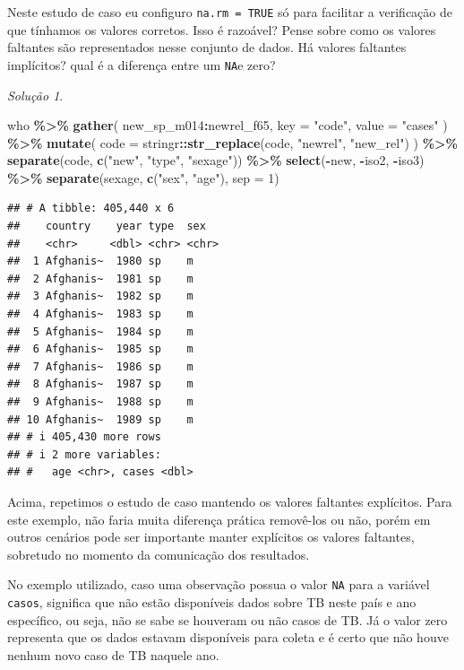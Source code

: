 \documentclass[
]{latex/krantz}
\newenvironment{Shaded}{\begin{snugshade}}{\end{snugshade}}
\newcommand{\AttributeTok}[1]{\textcolor[rgb]{0.13,0.29,0.53}{#1}}
\newcommand{\DecValTok}[1]{\textcolor[rgb]{0.00,0.00,0.81}{#1}}
\newcommand{\FunctionTok}[1]{\textcolor[rgb]{0.13,0.29,0.53}{\textbf{#1}}}
\newcommand{\NormalTok}[1]{#1}
\newcommand{\SpecialCharTok}[1]{\textcolor[rgb]{0.81,0.36,0.00}{\textbf{#1}}}
\newcommand{\StringTok}[1]{\textcolor[rgb]{0.31,0.60,0.02}{#1}}
\theoremstyle{definition}
\theoremstyle{definition}
\theoremstyle{definition}
\theoremstyle{definition}
\theoremstyle{remark}
\newtheorem*{solution}{Solução}
\begin{document}
Neste estudo de caso eu configuro \texttt{na.rm\ =\ TRUE} só para facilitar a verificação de que tínhamos os valores corretos. Isso é razoável? Pense sobre como os valores faltantes são representados nesse conjunto de dados. Há valores faltantes implícitos? qual é a diferença entre um \texttt{NA}e zero?

\begin{solution}
\leavevmode

\begin{Shaded}
\begin{Highlighting}[]
\NormalTok{who }\SpecialCharTok{\%\textgreater{}\%}
  \FunctionTok{gather}\NormalTok{(}
\NormalTok{    new\_sp\_m014}\SpecialCharTok{:}\NormalTok{newrel\_f65, }
    \AttributeTok{key =} \StringTok{"code"}\NormalTok{,}
    \AttributeTok{value =} \StringTok{"cases"}
\NormalTok{  ) }\SpecialCharTok{\%\textgreater{}\%}
  \FunctionTok{mutate}\NormalTok{(}
    \AttributeTok{code =}\NormalTok{ stringr}\SpecialCharTok{::}\FunctionTok{str\_replace}\NormalTok{(code, }\StringTok{"newrel"}\NormalTok{, }\StringTok{"new\_rel"}\NormalTok{)}
\NormalTok{  ) }\SpecialCharTok{\%\textgreater{}\%}
  \FunctionTok{separate}\NormalTok{(code, }\FunctionTok{c}\NormalTok{(}\StringTok{"new"}\NormalTok{, }\StringTok{"type"}\NormalTok{, }\StringTok{"sexage"}\NormalTok{)) }\SpecialCharTok{\%\textgreater{}\%}
  \FunctionTok{select}\NormalTok{(}\SpecialCharTok{{-}}\NormalTok{new, }\SpecialCharTok{{-}}\NormalTok{iso2, }\SpecialCharTok{{-}}\NormalTok{iso3) }\SpecialCharTok{\%\textgreater{}\%}
  \FunctionTok{separate}\NormalTok{(sexage, }\FunctionTok{c}\NormalTok{(}\StringTok{"sex"}\NormalTok{, }\StringTok{"age"}\NormalTok{), }\AttributeTok{sep =} \DecValTok{1}\NormalTok{)}
\end{Highlighting}
\end{Shaded}

\begin{verbatim}
## # A tibble: 405,440 x 6
##    country    year type  sex  
##    <chr>     <dbl> <chr> <chr>
##  1 Afghanis~  1980 sp    m    
##  2 Afghanis~  1981 sp    m    
##  3 Afghanis~  1982 sp    m    
##  4 Afghanis~  1983 sp    m    
##  5 Afghanis~  1984 sp    m    
##  6 Afghanis~  1985 sp    m    
##  7 Afghanis~  1986 sp    m    
##  8 Afghanis~  1987 sp    m    
##  9 Afghanis~  1988 sp    m    
## 10 Afghanis~  1989 sp    m    
## # i 405,430 more rows
## # i 2 more variables:
## #   age <chr>, cases <dbl>
\end{verbatim}

Acima, repetimos o estudo de caso mantendo os valores faltantes explícitos. Para este exemplo, não faria muita diferença prática removê-los ou não, porém em outros cenários pode ser importante manter explícitos os valores faltantes, sobretudo no momento da comunicação dos resultados.

No exemplo utilizado, caso uma observação possua o valor \texttt{NA} para a variável \texttt{casos}, significa que não estão disponíveis dados sobre TB neste país e ano específico, ou seja, não se sabe se houveram ou não casos de TB. Já o valor zero representa que os dados estavam disponíveis para coleta e é certo que não houve nenhum novo caso de TB naquele ano.

\end{solution}
\end{document}
